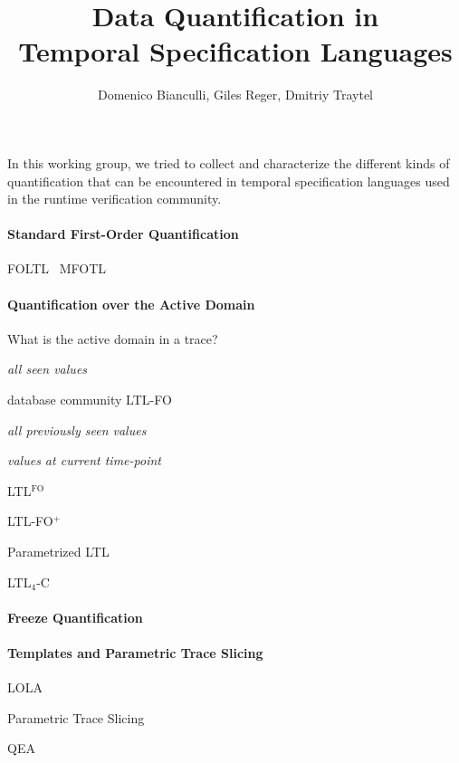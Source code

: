 \documentclass{article}
\title{Data Quantification in\\ Temporal Specification Languages}
\author{Domenico Bianculli, Giles Reger, Dmitriy Traytel}
\begin{document}
\maketitle

In this working group, we tried to collect and characterize the different kinds of quantification that can be encountered in temporal specification languages used in the runtime verification community. 

\paragraph{Standard First-Order Quantification}

FOLTL~\cite{Emerson90} MFOTL~\cite{Chomicki95,BasinKMZ15}

\paragraph{Quantification over the Active Domain}

What is the active domain in a trace?

\emph{all seen values}

database community LTL-FO~\cite{DeutschSVZ06}

\emph{all previously seen values}

\emph{values at current time-point}

LTL$^\text{FO}$~\cite{BauerKV15}

LTL-FO$^+$~\cite{HalleV08}

Parametrized LTL~\cite{Stolz10}

LTL$_4$-C~\cite{MedhatBFJ16}

\paragraph{Freeze Quantification}

\cite{BasinKZ17}

\paragraph{Templates and Parametric Trace Slicing}

LOLA~\cite{FaymonvilleFST16}

Parametric Trace Slicing~\cite{ChenR09,RegerR15}

QEA~\cite{BarringerFHRR12}



\end{document}
